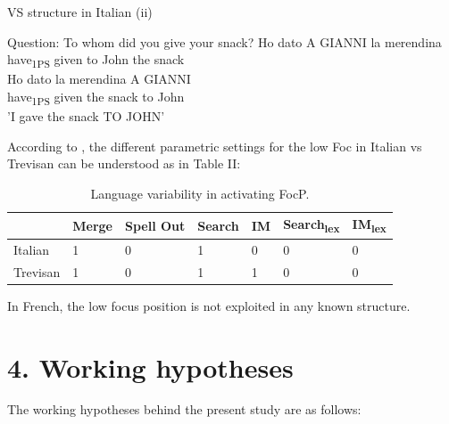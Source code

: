 \documentclass[fleqn,10pt]{wlscirep}
\begin{document}
\begin{exe}
    \ex VS structure in Italian (ii)
        \begin{xlist}
            \ex Question: To whom did you give your snack?
            \ex \gll * Ho dato A GIANNI la merendina\\
            {} have\textsubscript{1PS} given to John the snack\\
            \ex \gll Ho dato la merendina A GIANNI\\
            have\textsubscript{1PS} given the snack to John\\
            \glt 'I gave the snack TO JOHN'
        \end{xlist}
\end{exe}

According to \citet{bonan22}, the different parametric settings for the low Foc in Italian vs Trevisan can be understood as in Table II:

\begin{table}[ht]
    \centering
    \begin{tabular}{|l|l|l|l|l|l|l|}
    \hline
     & Merge & Spell Out & Search & IM & Search\textsubscript{lex} & IM\textsubscript{lex} \\
    \hline
    Italian & 1 & 0 & 1 & 0 & 0 & 0 \\
    \hline
    Trevisan & 1 & 0 & 1 & 1 & 0 & 0\\
    \hline
    \end{tabular}
    \caption{\label{tab:samp2}Language variability in activating FocP.}
    \end{table}

\noindent In French, the low focus position is not exploited in any known structure.

\section*{4. Working hypotheses}
The working hypotheses behind the present study are as follows:
\end{document}
